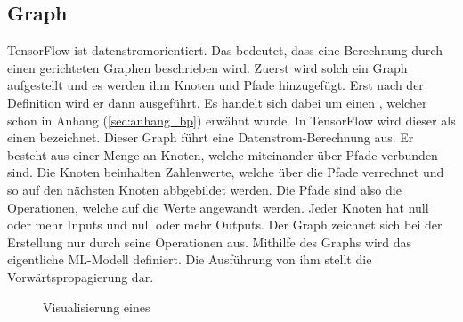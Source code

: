 \subsection{Graph}
TensorFlow ist datenstromorientiert. Das bedeutet, dass eine Berechnung
durch einen gerichteten Graphen beschrieben wird. Zuerst wird solch ein Graph
aufgestellt und es werden ihm Knoten und Pfade hinzugefügt. Erst nach der Definition wird er dann ausgeführt.
Es handelt sich dabei um einen , welcher schon in
Anhang (\ref{sec:anhang_bp}) erwähnt wurde.
In TensorFlow wird dieser als einen  bezeichnet.
\para{}
Dieser Graph führt eine Datenstrom-Berechnung aus.
Er besteht aus einer Menge an Knoten, welche miteinander über Pfade
verbunden sind. Die Knoten beinhalten Zahlenwerte, welche über die Pfade
verrechnet und so auf den nächsten Knoten abbgebildet werden.
Die Pfade sind also die Operationen, welche auf die Werte
angewandt werden. Jeder Knoten hat null oder mehr Inputs und null oder mehr Outputs.
Der Graph zeichnet sich bei der Erstellung nur durch seine Operationen aus.
\para{}
Mithilfe des Graphs wird das eigentliche ML-Modell definiert. Die Ausführung von
ihm stellt die Vorwärtspropagierung dar.
\para{}

\begin{figure}[h!]
  \caption{Visualisierung eines }
\end{figure}


